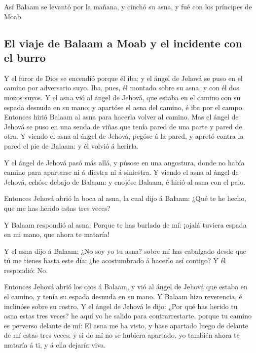  Así Balaam se levantó por la mañana, y cinchó su asna, y
fué con los príncipes de Moab.

\hypertarget{el-viaje-de-balaam-a-moab-y-el-incidente-con-el-burro}{%
\subsection{El viaje de Balaam a Moab y el incidente con el
burro}\label{el-viaje-de-balaam-a-moab-y-el-incidente-con-el-burro}}

 Y el furor de Dios se encendió porque él iba; y el ángel
de Jehová se puso en el camino por adversario suyo. Iba, pues, él
montado sobre su asna, y con él dos mozos suyos.  Y el asna
vió al ángel de Jehová, que estaba en el camino con su espada desnuda en
su mano; y apartóse el asna del camino, é iba por el campo. Entonces
hirió Balaam al asna para hacerla volver al camino.  Mas el
ángel de Jehová se puso en una senda de viñas que tenía pared de una
parte y pared de otra.  Y viendo el asna al ángel de
Jehová, pegóse á la pared, y apretó contra la pared el pie de Balaam: y
él volvió á herirla.

 Y el ángel de Jehová pasó más allá, y púsose en una
angostura, donde no había camino para apartarse ni á diestra ni á
siniestra.  Y viendo el asna al ángel de Jehová, echóse
debajo de Balaam: y enojóse Balaam, é hirió al asna con el palo.

 Entonces Jehová abrió la boca al asna, la cual dijo á
Balaam: ¿Qué te he hecho, que me has herido estas tres veces?

 Y Balaam respondió al asna: Porque te has burlado de mí:
¡ojalá tuviera espada en mi mano, que ahora te mataría!

 Y el asna dijo á Balaam: ¿No soy yo tu asna? sobre mí has
cabalgado desde que tú me tienes hasta este día; ¿he acostumbrado á
hacerlo así contigo? Y él respondió: No.~

 Entonces Jehová abrió los ojos á Balaam, y vió al ángel de
Jehová que estaba en el camino, y tenía su espada desnuda en su mano. Y
Balaam hizo reverencia, é inclinóse sobre su rostro.  Y el
ángel de Jehová le dijo: ¿Por qué has herido tu asna estas tres veces?
he aquí yo he salido para contrarrestarte, porque tu camino es perverso
delante de mí:  El asna me ha visto, y hase apartado luego
de delante de mí estas tres veces: y si de mí no se hubiera apartado, yo
también ahora te mataría á ti, y á ella dejaría viva.

